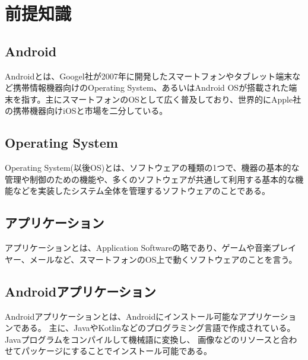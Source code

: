 \newpage
\section{前提知識}


\subsection{Android}
Androidとは、Googel社が2007年に開発したスマートフォンやタブレット端末など携帯情報機器向けのOperating System、あるいはAndroid OSが搭載された端末を指す。主にスマートフォンのOSとして広く普及しており、世界的にApple社の携帯機器向けiOSと市場を二分している。


\subsection{Operating System}
Operating System(以後OS)とは、ソフトウェアの種類の1つで、機器の基本的な管理や制御のための機能や、多くのソフトウェアが共通して利用する基本的な機能などを実装したシステム全体を管理するソフトウェアのことである。


\subsection{アプリケーション}

アプリケーションとは、Application Softwareの略であり、ゲームや音楽プレイヤー、メールなど、スマートフォンのOS上で動くソフトウェアのことを言う。


\subsection{Androidアプリケーション}
Androidアプリケーションとは、Androidにインストール可能なアプリケーションである。
主に、JavaやKotlinなどのプログラミング言語で作成されている。Javaプログラムをコンパイルして機械語に変換し、
画像などのリソースと合わせてパッケージにすることでインストール可能である。


